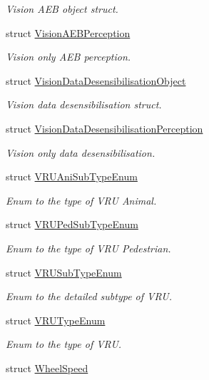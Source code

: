 \begin{DoxyCompactItemize}
\begin{DoxyCompactList}\small\item\em Vision A\+EB object struct. \end{DoxyCompactList}\item 
struct \hyperlink{structmaf__perception__interface_1_1VisionAEBPerception}{Vision\+A\+E\+B\+Perception}
\begin{DoxyCompactList}\small\item\em Vision only A\+EB perception. \end{DoxyCompactList}\item 
struct \hyperlink{structmaf__perception__interface_1_1VisionDataDesensibilisationObject}{Vision\+Data\+Desensibilisation\+Object}
\begin{DoxyCompactList}\small\item\em Vision data desensibilisation struct. \end{DoxyCompactList}\item 
struct \hyperlink{structmaf__perception__interface_1_1VisionDataDesensibilisationPerception}{Vision\+Data\+Desensibilisation\+Perception}
\begin{DoxyCompactList}\small\item\em Vision only data desensibilisation. \end{DoxyCompactList}\item 
struct \hyperlink{structmaf__perception__interface_1_1VRUAniSubTypeEnum}{V\+R\+U\+Ani\+Sub\+Type\+Enum}
\begin{DoxyCompactList}\small\item\em Enum to the type of V\+RU Animal. \end{DoxyCompactList}\item 
struct \hyperlink{structmaf__perception__interface_1_1VRUPedSubTypeEnum}{V\+R\+U\+Ped\+Sub\+Type\+Enum}
\begin{DoxyCompactList}\small\item\em Enum to the type of V\+RU Pedestrian. \end{DoxyCompactList}\item 
struct \hyperlink{structmaf__perception__interface_1_1VRUSubTypeEnum}{V\+R\+U\+Sub\+Type\+Enum}
\begin{DoxyCompactList}\small\item\em Enum to the detailed subtype of V\+RU. \end{DoxyCompactList}\item 
struct \hyperlink{structmaf__perception__interface_1_1VRUTypeEnum}{V\+R\+U\+Type\+Enum}
\begin{DoxyCompactList}\small\item\em Enum to the type of V\+RU. \end{DoxyCompactList}\item 
struct \hyperlink{structmaf__perception__interface_1_1WheelSpeed}{Wheel\+Speed}
\end{DoxyCompactItemize}

